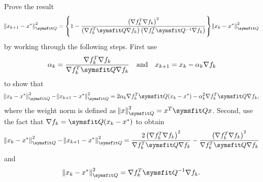\documentclass{assignment}[2019/09/15]
\newcommand{\ak}{\alpha_k}
\newcommand{\df}{\nabla f}
\newcommand{\nqs}[1]{\norm{#1}_{\matr{Q}}^2}
\newcommand{\dfdf}{\nabla f_k^T\nabla f_k}
\newcommand{\dfqdf}{\nabla f_k^T\matr{Q}\nabla f_k}
\newcommand{\dfqidf}{\nabla f_k^T\matr{Q}^{-1}\nabla f_k}
\begin{document}
    \begin{problem}
        Prove the result
        \begin{equation}
            \nqs{x_{k+1}-x^{*}}=\left\{1-\frac{\left(\dfdf\right)^2}{\left(\dfqdf\right)\left(\dfqidf\right)}\right\}\nqs{x_k-x^{*}}
        \end{equation}
        by working through the following steps. First use
        \begin{equation}
            \ak=\frac{\dfdf}{\dfqdf}\quad\text{and}\quad x_{k+1}=x_k-\ak\df_k
        \end{equation}
        to show that
        \begin{equation}
            \nqs{x_k-x^{*}}-\nqs{x_{k+1}-x^{*}}=2\ak\df_k^T\matr{Q}(x_k-x^*)-\ak^2\df_k^T\matr{Q}\df_k,
        \end{equation}
        where the weight norm is defined as $\nqs{x}=x^T\matr{Q}x$. Second, use the fact that $\df_k=\matr{Q}(x_k-x^*)$ to obtain
        \begin{equation}
            \nqs{x_k-x^*}-\nqs{x_{k+1}-x^{*}}=\frac{2\left(\dfdf\right)^2}{\dfqdf}-\frac{\left(\dfdf\right)^2}{\dfqdf}
        \end{equation}
        and
        \begin{equation}
            \nqs{x_k-x^*}=\dfqidf.
        \end{equation}
    \end{problem}
\end{document}
